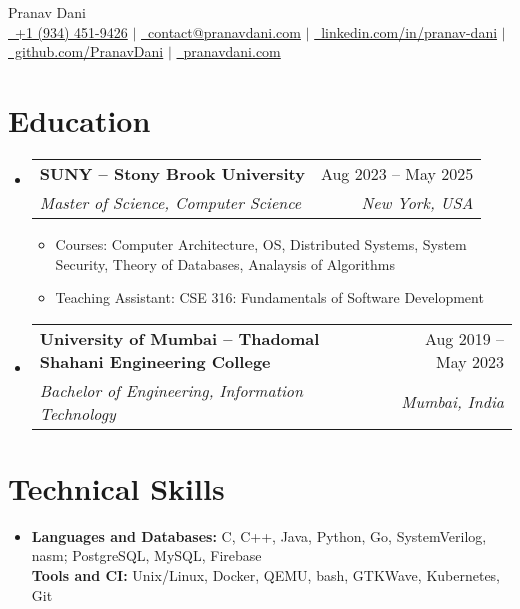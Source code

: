 \documentclass[letterpaper,11pt]{article}
\makeatletter
\newcommand{\resumeItem}[1]{
  \item\small{
    {#1 \vspace{-2pt}}
  }
}
\newcommand{\resumeSubheading}[4]{
  \vspace{-2pt}\item
    \begin{tabular*}{1.0\textwidth}[t]{l@{\extracolsep{\fill}}r}
      \vspace{-2pt}\textbf{#1} & \small #2 \\
      \textit{\small#3} & \textit{\small #4} \\
    \end{tabular*}\vspace{-7pt}
}
\newcommand{\resumeSubHeadingListStart}{\begin{itemize}[leftmargin=0.0in, label={}]}
\newcommand{\resumeSubHeadingListEnd}{\end{itemize}}
\newcommand{\resumeItemListStart}{\begin{itemize}}
\newcommand{\resumeItemListEnd}{\end{itemize}\vspace{-5pt}}
\makeatother
\begin{document}
\begin{center}
  {\huge Pranav Dani} \\ \vspace{4pt}
  \small
  \href{tel:+19344529426}{\raisebox{-0.2\height}\ +1 (934) 451-9426} $|$
  \href{mailto:contact@pranavdani.com}{\raisebox{-0.2\height}\    contact@pranavdani.com} $|$
  \href{https://linkedin.com/in/pranav-dani}{\raisebox{-0.2\height}\  linkedin.com/in/pranav-dani} $|$
  \href{https://github.com/PranavDani}{\raisebox{-0.2\height}\  github.com/PranavDani} $|$
  \href{https://pranavdani.com}{\raisebox{-0.1\height}\ pranavdani.com}
  \vspace{-8pt}
\end{center}


\section{Education}
\resumeSubHeadingListStart
\resumeSubheading
{SUNY -- Stony Brook University}{Aug 2023 -- May 2025}
{Master of Science, Computer Science}{New York, USA}
\resumeItemListStart
\resumeItem{Courses: Computer Architecture, OS, Distributed Systems, System Security, Theory of Databases, Analaysis of Algorithms}
\resumeItem{Teaching Assistant: CSE 316: Fundamentals of Software Development}
\resumeItemListEnd
\vspace{-3pt}

\resumeSubheading
{University of Mumbai -- Thadomal Shahani Engineering College}{Aug 2019 -- May 2023}
{Bachelor of Engineering, Information Technology}{Mumbai, India}
\resumeSubHeadingListEnd


\section{Technical Skills}
\begin{itemize}[leftmargin=0.2in, label={}]
  \item \textbf{Languages and Databases:} C, C++, Java, Python, Go, SystemVerilog, nasm; PostgreSQL, MySQL, Firebase\\
        \textbf{Tools and CI:} Unix/Linux, Docker, QEMU, bash, GTKWave, Kubernetes, Git
\end{itemize}
\vspace{-16pt}


\end{document}
